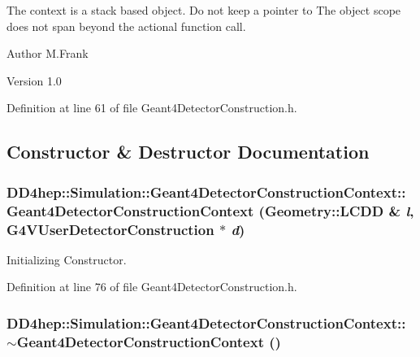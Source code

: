 The context is a stack based object. Do not keep a pointer to The object scope does not span beyond the actional function call.

\begin{DoxyAuthor}{Author}
M.Frank 
\end{DoxyAuthor}
\begin{DoxyVersion}{Version}
1.0 
\end{DoxyVersion}


Definition at line 61 of file Geant4DetectorConstruction.h.

\subsection{Constructor \& Destructor Documentation}
\hypertarget{class_d_d4hep_1_1_simulation_1_1_geant4_detector_construction_context_abb7bca1e231bedcaa5247d54dd18adda}{
\subsubsection[{Geant4DetectorConstructionContext}]{\setlength{\rightskip}{0pt plus 5cm}DD4hep::Simulation::Geant4DetectorConstructionContext::Geant4DetectorConstructionContext ({\bf Geometry::LCDD} \& {\em l}, \/  {\bf G4VUserDetectorConstruction} $\ast$ {\em d})}}
\label{class_d_d4hep_1_1_simulation_1_1_geant4_detector_construction_context_abb7bca1e231bedcaa5247d54dd18adda}


Initializing Constructor. 

Definition at line 76 of file Geant4DetectorConstruction.h.\hypertarget{class_d_d4hep_1_1_simulation_1_1_geant4_detector_construction_context_a4077c4e7962225ebbaf08a9fb2814cb9}{
\subsubsection[{$\sim$Geant4DetectorConstructionContext}]{\setlength{\rightskip}{0pt plus 5cm}DD4hep::Simulation::Geant4DetectorConstructionContext::$\sim$Geant4DetectorConstructionContext ()}}
\label{class_d_d4hep_1_1_simulation_1_1_geant4_detector_construction_context_a4077c4e7962225ebbaf08a9fb2814cb9}


